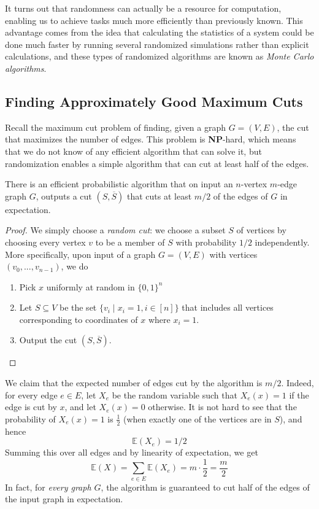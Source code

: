 \documentclass{article}
\begin{document}
  It turns out that randomness can actually be a resource for computation, enabling us to achieve tasks much more efficiently than previously known. This advantage comes from the idea that calculating the statistics of a system could be done much faster by running several randomized simulations rather than explicit calculations, and these types of randomized algorithms are known as \textit{Monte Carlo algorithms}. 

  \subsection{Finding Approximately Good Maximum Cuts}
  Recall the maximum cut problem of finding, given a graph $G = (V, E)$, the cut that maximizes the number of edges. This problem is \textbf{NP}-hard, which means that we do not know of any efficient algorithm that can solve it, but randomization enables a simple algorithm that can cut at least half of the edges. 

  \begin{theorem}
  There is an efficient probabilistic algorithm that on input an $n$-vertex $m$-edge graph $G$, outputs a cut $(S, \overline{S})$ that cuts at least $m/2$ of the edges of $G$ in expectation. 
  \end{theorem}
  \begin{proof}
  We simply choose a \textit{random cut}: we choose a subset $S$ of vertices by choosing every vertex $v$ to be a member of $S$ with probability $1/2$ independently. More specifically, upon input of a graph $G = (V, E)$ with vertices $(v_0, ..., v_{n-1})$, we do
  \begin{enumerate}
      \item Pick $x$ uniformly at random in $\{0,1\}^n$
      \item Let $S \subseteq V$ be the set $\{v_i \;|\; x_i = 1, i \in [n]\}$ that includes all vertices corresponding to coordinates of $x$ where $x_i = 1$. 
      \item Output the cut $(S, \overline{S})$. 
  \end{enumerate}
  \end{proof}

  We claim that the expected number of edges cut by the algorithm is $m/2$. Indeed, for every edge $e \in E$, let $X_e$ be the random variable such that $X_e (x) = 1$ if the edge is cut by $x$, and let $X_e (x) = 0$ otherwise. It is not hard to see that the probability of $X_e (x) = 1$ is $\frac{1}{2}$ (when exactly one of the vertices are in $S$), and hence 
  \[\mathbb{E} (X_e) = 1/2\]
  Summing this over all edges and by linearity of expectation, we get
  \[\mathbb{E}(X) = \sum_{e \in E} \mathbb{E}(X_e) = m \cdot \frac{1}{2} = \frac{m}{2}\]
  In fact, for \textit{every graph $G$}, the algorithm is guaranteed to cut half of the edges of the input graph in expectation. 
\end{document}
